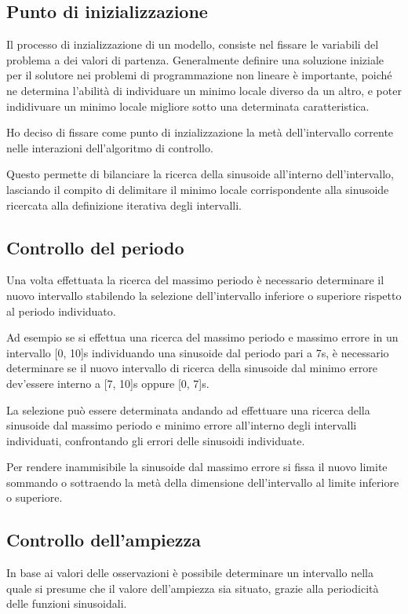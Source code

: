 \documentclass[a4paper,12pt]{report}
\begin{document}
\subsection{Punto di inizializzazione}
Il processo di inzializzazione di un modello, consiste nel fissare le variabili del problema a dei valori di partenza. Generalmente definire una soluzione iniziale per il solutore nei problemi di programmazione non lineare è importante, poiché ne determina l'abilità di individuare un minimo locale diverso da un altro, e poter indidivuare un minimo locale migliore sotto una determinata caratteristica.

Ho deciso di fissare come punto di inzializzazione la metà dell'intervallo corrente nelle interazioni dell'algoritmo di controllo.

Questo permette di bilanciare la ricerca della sinusoide all'interno dell'intervallo, lasciando il compito di delimitare il minimo locale corrispondente alla sinusoide ricercata alla definizione iterativa degli intervalli.


\subsection{Controllo del periodo}
\label{con:periodo}
Una volta effettuata la ricerca del massimo periodo è necessario determinare il nuovo intervallo stabilendo la selezione dell'intervallo inferiore o superiore rispetto al periodo individuato.

Ad esempio se si effettua una ricerca del massimo periodo e massimo errore in un intervallo [0, 10]s individuando una sinusoide dal periodo pari a 7s, è necessario determinare se il nuovo intervallo di ricerca della sinusoide dal minimo errore dev'essere interno a [7, 10]s oppure [0, 7]s.

La selezione può essere determinata andando ad effettuare una ricerca della sinusoide dal massimo periodo e minimo errore all'interno degli intervalli individuati, confrontando gli errori delle sinusoidi individuate.

Per rendere inammisibile la sinusoide dal massimo errore si fissa il nuovo limite sommando o sottraendo la metà della dimensione dell'intervallo al limite inferiore o superiore.

\subsection{Controllo dell'ampiezza}
\label{con:ampiezza}
In base ai valori delle osservazioni è possibile  determinare un intervallo nella quale si presume che il valore dell'ampiezza sia situato, grazie alla periodicità delle funzioni sinusoidali.
\end{document}
